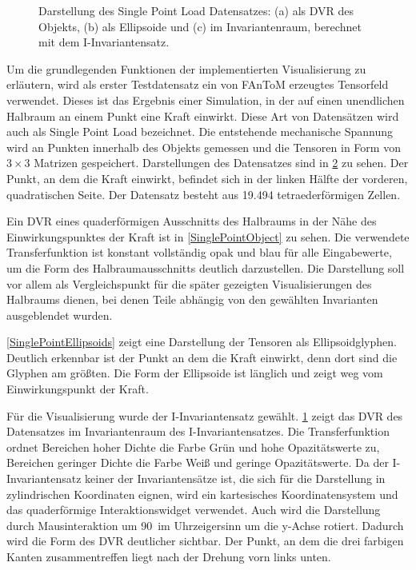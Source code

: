 \documentclass[a4paper,fontsize=12pt,toc=bib,parskip=half,ngerman]{scrartcl}
\begin{document}
\begin{figure}
\begin{subfigure}{0.34\textwidth}
		\subcaption{}
		\label{SinglePointInvariantSpace}
	\end{subfigure}
	\caption{Darstellung des Single Point Load Datensatzes: (a) als DVR des Objekts, (b) als Ellipsoide und (c) im Invariantenraum, berechnet mit dem I-Invariantensatz.}
	\label{SinglePoint}
\end{figure}
Um die grundlegenden Funktionen der implementierten Visualisierung zu erl\"autern, wird als erster Testdatensatz ein von FAnToM erzeugtes Tensorfeld verwendet. Dieses ist das Ergebnis einer Simulation, in der auf einen unendlichen Halbraum an einem Punkt eine Kraft einwirkt. Diese Art von Datens\"atzen wird auch als \glq Single Point Load\grq{} bezeichnet. Die entstehende mechanische Spannung wird an Punkten innerhalb des Objekts gemessen und die Tensoren in Form von $3\times3$ Matrizen gespeichert. Darstellungen des Datensatzes sind in \cref{SinglePoint} zu sehen. Der Punkt, an dem die Kraft einwirkt, befindet sich in der linken H\"alfte der vorderen, quadratischen Seite. Der Datensatz besteht aus 19.494 tetraederf\"ormigen Zellen.

Ein DVR eines quaderf\"ormigen Ausschnitts des Halbraums in der N\"ahe des Einwirkungspunktes der Kraft ist in \cref{SinglePointObject} zu sehen. Die verwendete Transferfunktion ist konstant vollst\"andig opak und blau f\"ur alle Eingabewerte, um die Form des Halbraumausschnitts deutlich darzustellen. Die Darstellung soll vor allem als Vergleichspunkt f\"ur die sp\"ater gezeigten Visualisierungen des Halbraums dienen, bei denen Teile abh\"angig von den gew\"ahlten Invarianten ausgeblendet wurden.

\cref{SinglePointEllipsoids} zeigt eine Darstellung der Tensoren als Ellipsoidglyphen. Deutlich erkennbar ist der Punkt an dem die Kraft einwirkt, denn dort sind die Glyphen am gr\"o{\ss}ten. Die Form der Ellipsoide ist l\"anglich und zeigt weg vom Einwirkungspunkt der Kraft.

F\"ur die Visualisierung wurde der I-Invariantensatz gew\"ahlt. \cref{SinglePointInvariantSpace} zeigt das DVR des Datensatzes im Invariantenraum des I-Invariantensatzes. Die Transferfunktion ordnet Bereichen hoher Dichte die Farbe Gr\"un und hohe Opazit\"atswerte zu, Bereichen geringer Dichte die Farbe Wei{\ss} und geringe Opazit\"atswerte. Da der I-Invariantensatz keiner der Invariantens\"atze ist, die sich f\"ur die Darstellung in zylindrischen Koordinaten eignen, wird ein kartesisches Koordinatensystem und das quaderf\"ormige Interaktionswidget verwendet. Auch wird die Darstellung durch Mausinteraktion um 90\textdegree~im Uhrzeigersinn um die y-Achse rotiert. Dadurch wird die Form des DVR deutlicher sichtbar. Der Punkt, an dem die drei farbigen Kanten zusammentreffen liegt nach der Drehung vorn links unten. 
\end{document}
